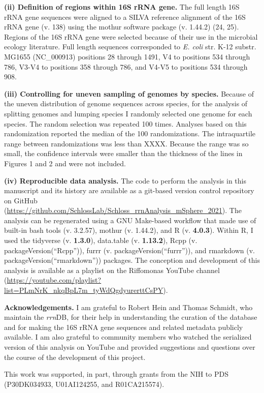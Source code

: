 \documentclass[
]{article}
\begin{document}
\textbf{(ii) Definition of regions within 16S rRNA gene.} The full
length 16S rRNA gene sequences were aligned to a SILVA reference
alignment of the 16S rRNA gene (v. 138) using the mothur software
package (v. 1.44.2) (24, 25). Regions of the 16S rRNA gene were selected
because of their use in the microbial ecology literature. Full length
sequences corresponded to \emph{E. coli} str. K-12 substr. MG1655
(NC\_000913) positions 28 through 1491, V4 to positions 534 through 786,
V3-V4 to positions 358 through 786, and V4-V5 to positions 534 through
908.

\textbf{(iii) Controlling for uneven sampling of genomes by species.}
Because of the uneven distribution of genome sequences across species,
for the analysis of splitting genomes and lumping species I randomly
selected one genome for each species. The random selection was repeated
100 times. Analyses based on this randomization reported the median of
the 100 randomizations. The intraquartile range between randomizations
was less than XXXX. Because the range was so small, the confidence
intervals were smaller than the thickness of the lines in Figures 1 and
2 and were not included.

\textbf{(iv) Reproducible data analysis.} The code to perform the
analysis in this manuscript and its history are available as a git-based
version control repository on GitHub
(\url{https://github.com/SchlossLab/Schloss_rrnAnalysis_mSphere_2021}).
The analysis can be regenerated using a GNU Make-based workflow that
made use of built-in bash tools (v. 3.2.57), mothur (v. 1.44.2), and R
(v. \textbf{4.0.3}). Within R, I used the tidyverse (v. \textbf{1.3.0}),
data.table (v. \textbf{1.13.2}), Rcpp (v. packageVersion(``Rcpp'')),
furrr (v. packageVersion(``furrr'')), and rmarkdown (v.
packageVersion(``rmarkdown'')) packages. The conception and development
of this analysis is available as a playlist on the Riffomonas YouTube
channel
(\url{https://youtube.com/playlist?list=PLmNrK_nkqBpL7m_tyWdQgdyurerttCsPY}).

\textbf{Acknowledgements.} I am grateful to Robert Hein and Thomas
Schmidt, who maintain the \emph{rrn}DB, for their help in understanding
the curation of the database and for making the 16S rRNA gene sequences
and related metadata publicly available. I am also grateful to community
members who watched the serialized version of this analysis on YouTube
and provided suggestions and questions over the course of the
development of this project.

This work was supported, in part, through grants from the NIH to PDS
(P30DK034933, U01AI124255, and R01CA215574).
\end{document}
